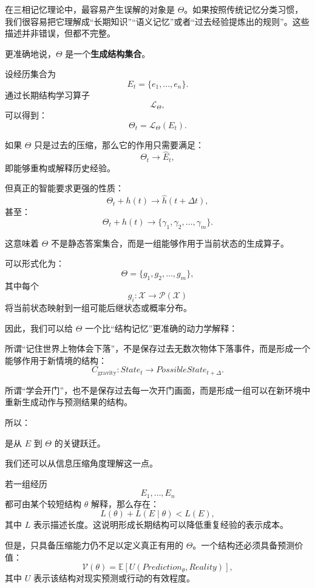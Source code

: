 在三相记忆理论中，最容易产生误解的对象是 \(\Theta\)。如果按照传统记忆分类习惯，我们很容易把它理解成“长期知识”“语义记忆”或者“过去经验提炼出的规则”。这些描述并非错误，但都不完整。

更准确地说，\(\Theta\) 是一个\textbf{生成结构集合}。

设经历集合为
\[
E_t=\{e_1,\ldots,e_n\}.
\]
通过长期结构学习算子
\[
\mathcal L_\Theta,
\]
可以得到：
\[
\Theta_t
=
\mathcal L_\Theta(E_t).
\]

如果 \(\Theta\) 只是过去的压缩，那么它的作用只需要满足：
\[
\Theta_t
\rightarrow
\widehat E_t,
\]
即能够重构或解释历史经验。

但真正的智能要求更强的性质：
\[
\Theta_t
+
h(t)
\rightarrow
\widehat h(t+\Delta t),
\]
甚至：
\[
\Theta_t
+
h(t)
\rightarrow
\{\gamma_1,\gamma_2,\ldots,\gamma_m\}.
\]

这意味着 \(\Theta\) 不是静态答案集合，而是一组能够作用于当前状态的生成算子。

可以形式化为：
\[
\Theta
=
\{
g_1,g_2,\ldots,g_m
\},
\]
其中每个
\[
g_i:
\mathcal X
\rightarrow
\mathcal P(\mathcal X)
\]
将当前状态映射到一组可能后继状态或概率分布。

因此，我们可以给 \(\Theta\) 一个比“结构记忆”更准确的动力学解释：
\begin{statementbox}
\centering
{}
\end{statementbox}

所谓“记住世界上物体会下落”，不是保存过去无数次物体下落事件，而是形成一个能够作用于新情境的结构：
\[
C_{\mathrm{gravity}}
:
State_t
\rightarrow
PossibleState_{t+\Delta}.
\]

所谓“学会开门”，也不是保存过去每一次开门画面，而是形成一组可以在新环境中重新生成动作与预测结果的结构。

所以：

\begin{statementbox}
\centering
{}
\end{statementbox}
是从 \(E\) 到 \(\Theta\) 的关键跃迁。

我们还可以从信息压缩角度理解这一点。

若一组经历
\[
E_1,\ldots,E_n
\]
都可由某个较短结构 \(\theta\) 解释，那么存在：
\[
L(\theta)
+
L(E\mid\theta)
<
L(E),
\]
其中 \(L\) 表示描述长度。这说明形成长期结构可以降低重复经验的表示成本。

但是，只具备压缩能力仍不足以定义真正有用的 \(\Theta\)。一个结构还必须具备预测价值：
\[
\mathcal V(\theta)
=
\mathbb E
[
U(
Prediction_\theta,
Reality
)
],
\]
其中 \(U\) 表示该结构对现实预测或行动的有效程度。

